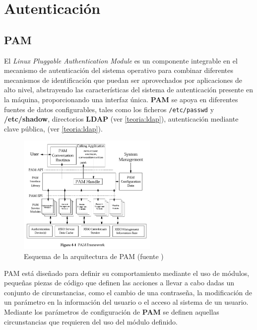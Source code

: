 \section{Autenticación}
\subsection{PAM}

El \textit{Linux Pluggable Authentication Module}\cite{opengroup:rfc86.0} es un componente integrable en el mecanismo de autenticación del sistema operativo para combinar diferentes mecanismos de identificación que puedan ser aprovechados por aplicaciones de alto nivel, abstrayendo las características del sistema de autenticación presente en la máquina, proporcionando una interfaz única. \textbf{PAM} se apoya en diferentes fuentes de datos configurables, tales como los ficheros \texttt{/etc/passwd} y \textbf{/etc/shadow}, directorios \textbf{LDAP} (ver \ref{teoria:ldap}), autenticación mediante clave pública, (ver \ref{teoria:ldap}).

\begin{figure}[H]
\centering
  \immediate{}
  \includegraphics[width=0.6\textwidth]{Chapter2/Figures/pamstructure.png}
  \caption[Esquema de la arquitectura de PAM]{Esquema de la arquitectura de PAM (fuente \cite{opengroup:rfc86.0})}
\end{figure}

PAM está diseñado para definir su comportamiento mediante el uso de módulos, pequeñas piezas de código que definen las acciones a llevar a cabo dadas un conjunto de circunstancias, como el cambio de una contraseña, la modificación de un parámetro en la información del usuario o el acceso al sistema de un usuario. Mediante los parámetros de configuración de \textbf{PAM} se definen aquellas circunstancias que requieren del uso del módulo definido.

